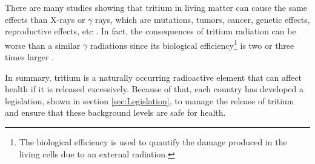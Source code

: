 There are many studies showing that tritium in living matter can cause the same effects than X-rays or $\gamma$ rays, which are mutations, tumors, cancer, genetic effects, reproductive effects, etc \cite{StraumeTritiumHazard, RytoemaaTritiumHazard}. In fact, the consequences of tritium radiation can be worse than a similar $\gamma$ radiations since its biological efficiency\footnote{The biological efficiency is used to quantify the damage produced in the living cells due to an external radiation.} is two or three times larger \cite{StraumeTritiumHazard}.

In summary, tritium is a naturally occurring radioactive element that can affect health if it is released excessively. Because of that, each country has developed a legislation, shown in section \ref{sec:Legislation}, to manage the release of tritium and ensure that these background levels are safe for health.





